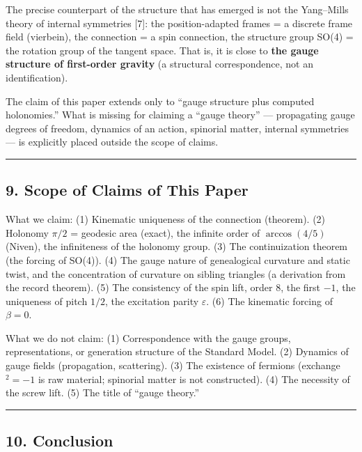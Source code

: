 \documentclass[
]{ltjsarticle}
\begin{document}
The precise counterpart of the structure that has emerged is not the
Yang--Mills theory of internal symmetries {[}7{]}: the position-adapted
frames = a discrete frame field (vierbein), the connection = a spin
connection, the structure group SO(4) = the rotation group of the
tangent space. That is, it is close to \textbf{the gauge structure of
first-order gravity} (a structural correspondence, not an
identification).

The claim of this paper extends only to ``gauge structure plus computed
holonomies.'' What is missing for claiming a ``gauge theory'' ---
propagating gauge degrees of freedom, dynamics of an action, spinorial
matter, internal symmetries --- is explicitly placed outside the scope
of claims.

\begin{center}\rule{0.5\linewidth}{0.5pt}\end{center}

\subsection{9. Scope of Claims of This
Paper}\label{scope-of-claims-of-this-paper}

What we claim: (1) Kinematic uniqueness of the connection (theorem). (2)
Holonomy \(\pi/2\) = geodesic area (exact), the infinite order of
\(\arccos(4/5)\) (Niven), the infiniteness of the holonomy group. (3)
The continuization theorem (the forcing of SO(4)). (4) The gauge nature
of genealogical curvature and static twist, and the concentration of
curvature on sibling triangles (a derivation from the record theorem).
(5) The consistency of the spin lift, order 8, the first \(-1\), the
uniqueness of pitch \(1/2\), the excitation parity \(\varepsilon\). (6)
The kinematic forcing of \(\beta=0\).

What we do not claim: (1) Correspondence with the gauge groups,
representations, or generation structure of the Standard Model. (2)
Dynamics of gauge fields (propagation, scattering). (3) The existence of
fermions (exchange\(^2=-1\) is raw material; spinorial matter is not
constructed). (4) The necessity of the screw lift. (5) The title of
``gauge theory.''

\begin{center}\rule{0.5\linewidth}{0.5pt}\end{center}

\subsection{10. Conclusion}\label{conclusion}
\end{document}
